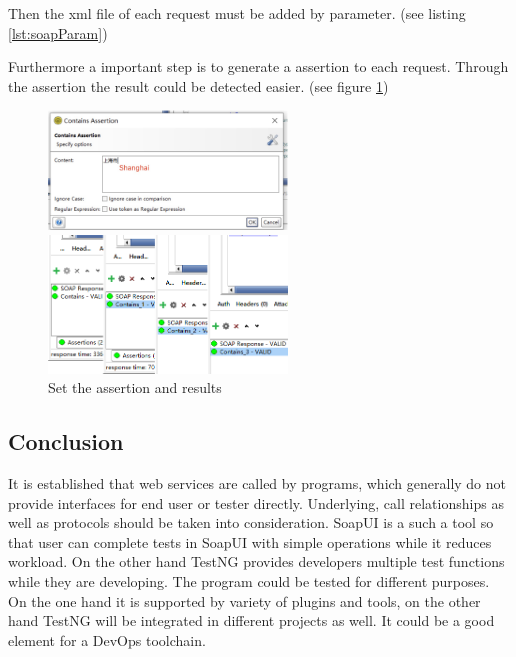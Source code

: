 \documentclass[12pt,a4paper,bibliography=totocnumbered,listof=totocnumbered]{article}
\begin{document}
Then the xml file of each request must be added by parameter. (see listing \ref{lst:soapParam})
\vspace{1em}

Furthermore a important step is to generate a assertion to each request. Through the assertion the result could be detected easier. (see figure \ref{fig:soap02})
\begin{figure}[H] 
	\begin{minipage}[t]{0.5\linewidth} 
	\centering 
	\includegraphics[width=2.5in]{pics/soap03.png}
	\end{minipage}%
	\begin{minipage}[t]{0.5\linewidth} 
	\centering 
	\includegraphics[width=2.5in]{pics/soap04.png} 
	\end{minipage} %
	\caption{Set the assertion and results}
	\label{fig:soap02}
\end{figure}

\subsection{Conclusion}
It is established that web services are called by programs, which generally do not provide interfaces for end user or tester directly.
Underlying, call relationships as well as protocols should be taken into consideration. SoapUI is a such a tool
so that user can complete tests in SoapUI with simple operations while it reduces workload. On the other hand TestNG provides
developers multiple test functions while they are developing. The program could be tested for different purposes. On the one hand it is supported by variety of plugins and tools,
on the other hand TestNG will be integrated in different projects as well. It could be a good element for a DevOps toolchain.
\end{document}
